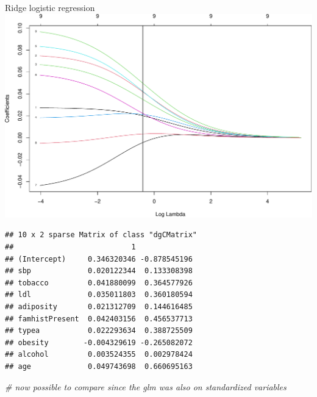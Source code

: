 \documentclass[
  ignorenonframetext,
]{beamer}
\newenvironment{Shaded}{\begin{snugshade}}{\end{snugshade}}
\newcommand{\CommentTok}[1]{\textcolor[rgb]{0.56,0.35,0.01}{\textit{#1}}}
\newcommand{\DataTypeTok}[1]{\textcolor[rgb]{0.13,0.29,0.53}{#1}}
\newcommand{\FloatTok}[1]{\textcolor[rgb]{0.00,0.00,0.81}{#1}}
\newcommand{\KeywordTok}[1]{\textcolor[rgb]{0.13,0.29,0.53}{\textbf{#1}}}
\newcommand{\NormalTok}[1]{#1}
\newcommand{\OperatorTok}[1]{\textcolor[rgb]{0.81,0.36,0.00}{\textbf{#1}}}
\begin{document}
\begin{frame}[fragile]
\begin{block}{Ridge logistic regression}
\includegraphics{L3_files/figure-beamer/unnamed-chunk-7-3.pdf}

\begin{Shaded}
\end{Shaded}

\begin{verbatim}
## 10 x 2 sparse Matrix of class "dgCMatrix"
##                           1             
## (Intercept)     0.346320346 -0.878545196
## sbp             0.020122344  0.133308398
## tobacco         0.041880099  0.364577926
## ldl             0.035011803  0.360180594
## adiposity       0.021312709  0.144616485
## famhistPresent  0.042403156  0.456537713
## typea           0.022293634  0.388725509
## obesity        -0.004329619 -0.265082072
## alcohol         0.003524355  0.002978424
## age             0.049743698  0.660695163
\end{verbatim}

\begin{Shaded}
\begin{Highlighting}[]
\CommentTok{# now possible to compare since the glm was also on standardized variables}
\end{Highlighting}
\end{Shaded}

\end{block}

\end{frame}
\end{document}
